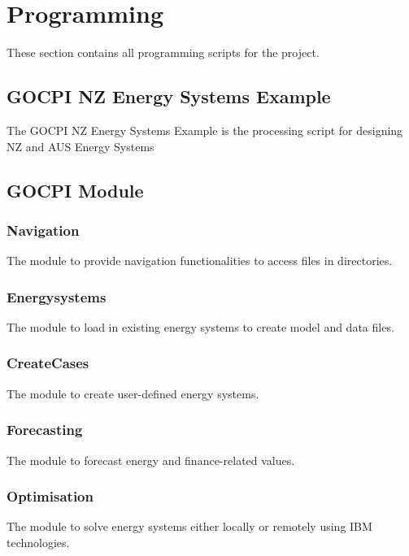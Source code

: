 \documentclass[12pt]{article}
\begin{document}
\section{Programming}
These section contains all programming scripts for the project.
\subsection{GOCPI NZ Energy Systems Example}

The GOCPI NZ Energy Systems Example is the processing script for designing NZ and AUS Energy Systems
\subsection{GOCPI Module}
\subsubsection{Navigation}
The module to provide navigation functionalities to access files in directories.

\subsubsection{Energysystems}
The module to load in existing energy systems to create model and data files.

\subsubsection{CreateCases}
The module to create user-defined energy systems.

\subsubsection{Forecasting}
The module to forecast energy and finance-related values.

\subsubsection{Optimisation}
The module to solve energy systems either locally or remotely using IBM technologies.

\end{document}
